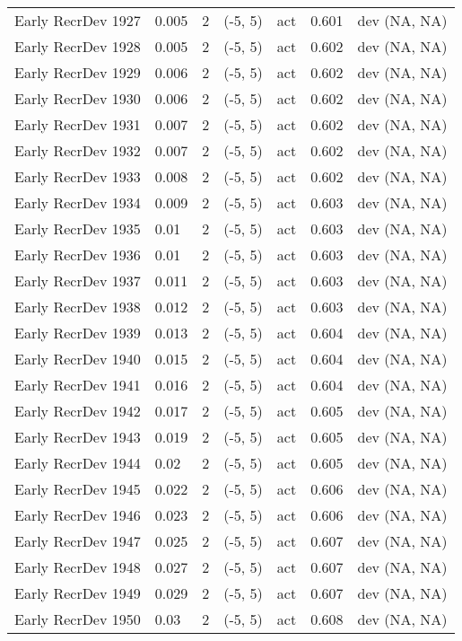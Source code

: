 \documentclass[11pt,
  english,
  letterpaper,
]{article}
\begin{document}
\begin{landscape}
\begin{longtable}[t]{>{\raggedright\arraybackslash}p{7.5cm}lllll>{\raggedright\arraybackslash}p{3.5cm}}
Early RecrDev 1927 & 0.005 & 2 & (-5, 5) & act & 0.601 & dev (NA, NA)\\
Early RecrDev 1928 & 0.005 & 2 & (-5, 5) & act & 0.602 & dev (NA, NA)\\
Early RecrDev 1929 & 0.006 & 2 & (-5, 5) & act & 0.602 & dev (NA, NA)\\
Early RecrDev 1930 & 0.006 & 2 & (-5, 5) & act & 0.602 & dev (NA, NA)\\
Early RecrDev 1931 & 0.007 & 2 & (-5, 5) & act & 0.602 & dev (NA, NA)\\
Early RecrDev 1932 & 0.007 & 2 & (-5, 5) & act & 0.602 & dev (NA, NA)\\
Early RecrDev 1933 & 0.008 & 2 & (-5, 5) & act & 0.602 & dev (NA, NA)\\
Early RecrDev 1934 & 0.009 & 2 & (-5, 5) & act & 0.603 & dev (NA, NA)\\
Early RecrDev 1935 & 0.01 & 2 & (-5, 5) & act & 0.603 & dev (NA, NA)\\
Early RecrDev 1936 & 0.01 & 2 & (-5, 5) & act & 0.603 & dev (NA, NA)\\
Early RecrDev 1937 & 0.011 & 2 & (-5, 5) & act & 0.603 & dev (NA, NA)\\
Early RecrDev 1938 & 0.012 & 2 & (-5, 5) & act & 0.603 & dev (NA, NA)\\
Early RecrDev 1939 & 0.013 & 2 & (-5, 5) & act & 0.604 & dev (NA, NA)\\
Early RecrDev 1940 & 0.015 & 2 & (-5, 5) & act & 0.604 & dev (NA, NA)\\
Early RecrDev 1941 & 0.016 & 2 & (-5, 5) & act & 0.604 & dev (NA, NA)\\
Early RecrDev 1942 & 0.017 & 2 & (-5, 5) & act & 0.605 & dev (NA, NA)\\
Early RecrDev 1943 & 0.019 & 2 & (-5, 5) & act & 0.605 & dev (NA, NA)\\
Early RecrDev 1944 & 0.02 & 2 & (-5, 5) & act & 0.605 & dev (NA, NA)\\
Early RecrDev 1945 & 0.022 & 2 & (-5, 5) & act & 0.606 & dev (NA, NA)\\
Early RecrDev 1946 & 0.023 & 2 & (-5, 5) & act & 0.606 & dev (NA, NA)\\
Early RecrDev 1947 & 0.025 & 2 & (-5, 5) & act & 0.607 & dev (NA, NA)\\
Early RecrDev 1948 & 0.027 & 2 & (-5, 5) & act & 0.607 & dev (NA, NA)\\
Early RecrDev 1949 & 0.029 & 2 & (-5, 5) & act & 0.607 & dev (NA, NA)\\
Early RecrDev 1950 & 0.03 & 2 & (-5, 5) & act & 0.608 & dev (NA, NA)\\

\end{longtable}
\end{landscape}
\end{document}
